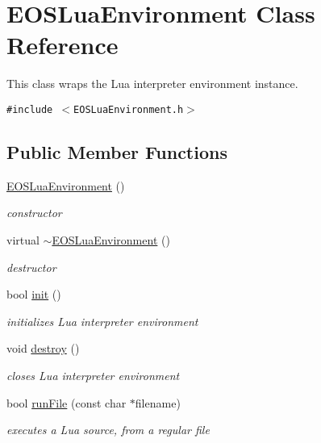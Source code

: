 \hypertarget{classEOSLuaEnvironment}{
\section{EOSLuaEnvironment Class Reference}
\label{classEOSLuaEnvironment}
}
This class wraps the Lua interpreter environment instance.  


{\tt \#include $<$EOSLuaEnvironment.h$>$}

\subsection*{Public Member Functions}
\begin{CompactItemize}
\item 
\hyperlink{classEOSLuaEnvironment_9d99c0b601ab2e3e86c11b7410a00d26}{EOSLuaEnvironment} ()
\begin{CompactList}\small\item\em constructor \item\end{CompactList}\item 
virtual \hyperlink{classEOSLuaEnvironment_d57156a90aff28c59db3fc756bed0d94}{$\sim$EOSLuaEnvironment} ()
\begin{CompactList}\small\item\em destructor \item\end{CompactList}\item 
bool \hyperlink{classEOSLuaEnvironment_50fa986c464d28a30c07178165a9aa8c}{init} ()
\begin{CompactList}\small\item\em initializes Lua interpreter environment \item\end{CompactList}\item 
void \hyperlink{classEOSLuaEnvironment_30d30f126d7c66533bfc73cc580ea9de}{destroy} ()
\begin{CompactList}\small\item\em closes Lua interpreter environment \item\end{CompactList}\item 
bool \hyperlink{classEOSLuaEnvironment_c1657fa448dfda93c41f1a09a77aa91e}{runFile} (const char $\ast$filename)
\begin{CompactList}\small\item\em executes a Lua source, from a regular file \item\end{CompactList}\item 

\end{CompactItemize}
